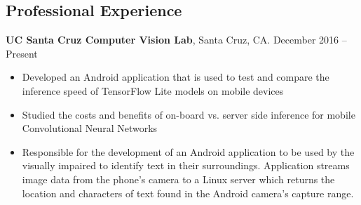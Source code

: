 \documentclass[mm,line]{res}
\newcommand\tab[1][1cm]{\hspace*{#1}}
\begin{document}
\begin{resume}
\section{\sc Professional Experience}
{\bf UC Santa Cruz Computer Vision Lab}, Santa Cruz, CA.  \hfill{December 2016 -- Present}\\
\tab[4mm]{\em Software Research Assistant}\hfill 
\begin{itemize} %
	\item Developed an Android application that is used to test and compare the inference speed of TensorFlow Lite models on mobile devices
	\item  Studied the costs and benefits of on-board vs. server side inference for mobile Convolutional Neural Networks
	\item 	Responsible for the development of an Android application to be used by the visually impaired to identify text in their surroundings. Application streams image data from the phone's camera to a Linux server which returns the location and characters of text found in the Android camera's capture range.
\end{itemize}


\end{resume}
\end{document}
